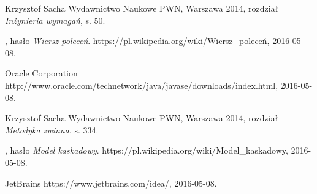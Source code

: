 \documentclass[11pt]{aghdpl}
\begin{document}
\begin{thebibliography}{1}
\bibitem{}
\label{bib:analiza_wymagan}
Krzysztof Sacha
\newblock Wydawnictwo Naukowe PWN, Warszawa 2014,
\newblock rozdział {\em Inżynieria wymagań}, s. 50.

\bibitem{}
\label{bib:wiki_wierszPolecen}
, hasło {\em Wiersz poleceń}.
\newblock https://pl.wikipedia.org/wiki/Wiersz\_poleceń, 2016-05-08.

\bibitem{}
\label{bib:java}
Oracle Corporation
\newblock http://www.oracle.com/technetwork/java/javase/downloads/index.html, 2016-05-08.

\bibitem{}
\label{bib:analiza_wymagan}
Krzysztof Sacha
\newblock Wydawnictwo Naukowe PWN, Warszawa 2014,
\newblock rozdział {\em Metodyka zwinna}, s. 334.

\bibitem{}
\label{bib:wiki_waterfall}
, hasło {\em Model kaskadowy}.
\newblock https://pl.wikipedia.org/wiki/Model\_kaskadowy, 2016-05-08.
	
\bibitem{}
\label{bib:intellij}
JetBrains
\newblock https://www.jetbrains.com/idea/, 2016-05-08.

\end{thebibliography}
\end{document}
